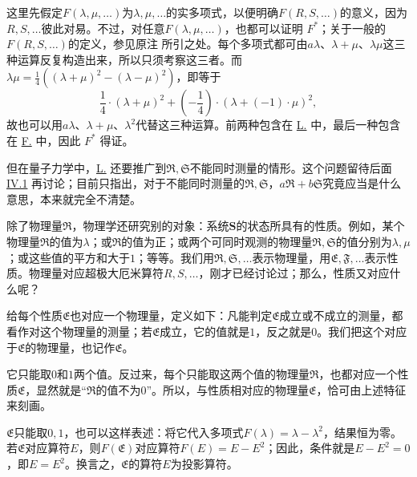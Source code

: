 \documentclass[fontsize=13pt,twoside,openany,headings=normal,parskip=false,bookmarkpackage=false,DIV=calc]{scrbook}
\begin{document}
这里先假定$F(\lambda,\allowbreak \mu,\allowbreak \ldots)$为$\lambda,\allowbreak \mu,\allowbreak \ldots$的实多项式，以便明确$F(R,\allowbreak S,\allowbreak \ldots)$的意义，因为$R,\allowbreak S,\allowbreak \ldots$彼此对易。不过，对任意$F(\lambda,\allowbreak \mu,\allowbreak \ldots)$，也都可以证明 \hyperref[post:III.5.Fstar]{$F^*$}；关于一般的$F(R,\allowbreak S,\allowbreak \ldots)$的定义，参见原注 \hyperlink{note-94}{} 所引之处。每个多项式都可由$a\lambda$、$\lambda+\mu$、$\lambda\mu$这三种运算反复构造出来，所以只须考察这三者。而$\lambda\mu=\frac14((\lambda+\mu)^2-(\lambda-\mu)^2)$，即等于
\[
\frac14\cdot(\lambda+\mu)^2+\left(-\frac14\right)\cdot(\lambda+(-1)\cdot\mu)^2,
\]
故也可以用$a\lambda$、$\lambda+\mu$、$\lambda^2$代替这三种运算。前两种包含在 \hyperref[post:III.5.L]{L.} 中，最后一种包含在 \hyperref[post:III.5.F]{F.} 中，因此 \hyperref[post:III.5.Fstar]{$F^*$} 得证。

但在量子力学中，\hyperref[post:III.5.L]{L.} 还要推广到$\mathfrak R,\allowbreak \mathfrak S$不能同时测量的情形。这个问题留待后面 \hyperref[sec:IV.1]{IV.1} 再讨论；目前只指出，对于不能同时测量的$\mathfrak R,\allowbreak \mathfrak S$，$a\mathfrak R+b\mathfrak S$究竟应当是什么意思，本来就完全不清楚。

除了物理量$\mathfrak R$，物理学还研究别的对象：系统$\boldsymbol{S}$的状态所具有的性质。例如，某个物理量$\mathfrak R$的值为$\lambda$；或$\mathfrak R$的值为正；或两个可同时观测的物理量$\mathfrak R,\allowbreak \mathfrak S$的值分别为$\lambda,\allowbreak \mu$；或这些值的平方和大于$1$；等等。我们用$\mathfrak R,\allowbreak \mathfrak S,\allowbreak \ldots$表示物理量，用$\mathfrak E,\allowbreak \mathfrak F,\allowbreak \ldots$表示性质。物理量对应超极大厄米算符$R,\allowbreak S,\allowbreak \ldots$，刚才已经讨论过；那么，性质又对应什么呢？

给每个性质$\mathfrak E$也对应一个物理量，定义如下：凡能判定$\mathfrak E$成立或不成立的测量，都看作对这个物理量的测量；若$\mathfrak E$成立，它的值就是$1$，反之就是$0$。我们把这个对应于$\mathfrak E$的物理量，也记作$\mathfrak E$。

它只能取$0$和$1$两个值。反过来，每个只能取这两个值的物理量$\mathfrak R$，也都对应一个性质$\mathfrak E$，显然就是“$\mathfrak R$的值不为$0$”。\hypertarget{origpage-132}{}\label{origpage-132}所以，与性质相对应的物理量$\mathfrak E$，恰可由上述特征来刻画。

$\mathfrak E$只能取$0,\allowbreak 1$，也可以这样表述：将它代入多项式$F(\lambda)=\lambda-\lambda^2$，结果恒为零。若$\mathfrak E$对应算符$E$，则$F(\mathfrak E)$对应算符$F(E)=E-E^2$；因此，条件就是$E-E^2=0$，即$E=E^2$。换言之，$\mathfrak E$的算符$E$为投影算符。
\end{document}
